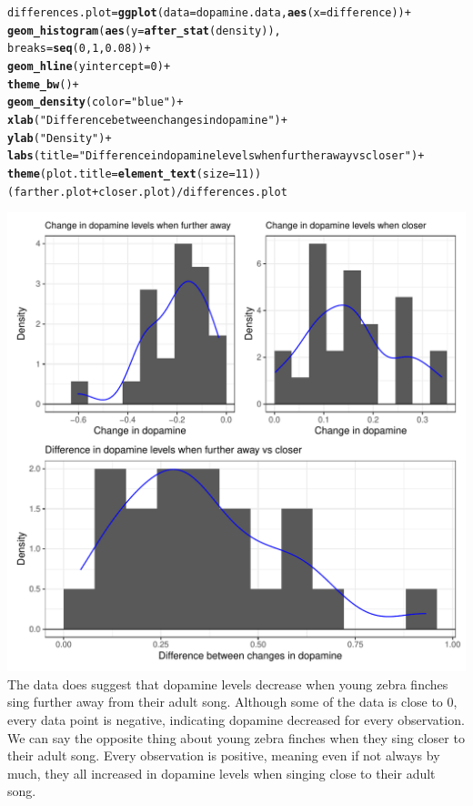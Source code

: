 \documentclass{article}\usepackage[]{graphicx}\usepackage[]{xcolor}
\makeatletter
\def\maxwidth{ %
  \ifdim\Gin@nat@width>\linewidth
    \linewidth
  \else
    \Gin@nat@width
  \fi
}
\newcommand{\hlnum}[1]{\textcolor[rgb]{0.686,0.059,0.569}{#1}}%
\newcommand{\hlsng}[1]{\textcolor[rgb]{0.192,0.494,0.8}{#1}}%
\newcommand{\hlopt}[1]{\textcolor[rgb]{0,0,0}{#1}}%
\newcommand{\hldef}[1]{\textcolor[rgb]{0.345,0.345,0.345}{#1}}%
\newcommand{\hlkwb}[1]{\textcolor[rgb]{0.69,0.353,0.396}{#1}}%
\newcommand{\hlkwc}[1]{\textcolor[rgb]{0.333,0.667,0.333}{#1}}%
\newcommand{\hlkwd}[1]{\textcolor[rgb]{0.737,0.353,0.396}{\textbf{#1}}}%
\newenvironment{kframe}{%
 \def\at@end@of@kframe{}%
 \ifinner\ifhmode%
  \def\at@end@of@kframe{\end{minipage}}%
  \begin{minipage}{\columnwidth}%
 \fi\fi%
 \def\FrameCommand##1{\hskip\@totalleftmargin \hskip-\fboxsep
 \colorbox{shadecolor}{##1}\hskip-\fboxsep
     \hskip-\linewidth \hskip-\@totalleftmargin \hskip\columnwidth}%
 \MakeFramed {\advance\hsize-\width
   \@totalleftmargin\z@ \linewidth\hsize
   \@setminipage}}%
 {\par\unskip\endMakeFramed%
 \at@end@of@kframe}
\newenvironment{knitrout}{}{} %
\makeatother
\begin{document}
\begin{enumerate}
\begin{enumerate}
\begin{knitrout}
\begin{kframe}
\begin{alltt}
\hldef{differences.plot} \hlkwb{=} \hlkwd{ggplot}\hldef{(}\hlkwc{data} \hldef{= dopamine.data,} \hlkwd{aes}\hldef{(}\hlkwc{x}\hldef{=difference))}\hlopt{+}
  \hlkwd{geom_histogram}\hldef{(}\hlkwd{aes}\hldef{(}\hlkwc{y}\hldef{=}\hlkwd{after_stat}\hldef{(density)),}
                 \hlkwc{breaks}\hldef{=}\hlkwd{seq}\hldef{(}\hlnum{0}\hldef{,}\hlnum{1}\hldef{,}\hlnum{0.08}\hldef{))} \hlopt{+}
  \hlkwd{geom_hline}\hldef{(}\hlkwc{yintercept}\hldef{=}\hlnum{0}\hldef{)}\hlopt{+}
  \hlkwd{theme_bw}\hldef{()}\hlopt{+}
  \hlkwd{geom_density}\hldef{(}\hlkwc{color} \hldef{=} \hlsng{"blue"}\hldef{)} \hlopt{+}
  \hlkwd{xlab}\hldef{(}\hlsng{"Difference between changes in dopamine"}\hldef{)}\hlopt{+}
  \hlkwd{ylab}\hldef{(}\hlsng{"Density"}\hldef{)}\hlopt{+}
  \hlkwd{labs}\hldef{(}\hlkwc{title} \hldef{=} \hlsng{"Difference in dopamine levels when further away vs closer"}\hldef{)} \hlopt{+}
  \hlkwd{theme}\hldef{(}\hlkwc{plot.title} \hldef{=} \hlkwd{element_text}\hldef{(}\hlkwc{size} \hldef{=} \hlnum{11}\hldef{))}
\hldef{(farther.plot} \hlopt{+} \hldef{closer.plot)} \hlopt{/} \hldef{differences.plot}
\end{alltt}
\end{kframe}
\includegraphics[width=\maxwidth]{figure/unnamed-chunk-4-1} 
\end{knitrout}
The data does suggest that dopamine levels decrease when young zebra finches sing further away from their adult song. Although some of the data is close to 0, every data point is negative, indicating dopamine decreased for every observation. We can say the opposite thing about young zebra finches when they sing closer to their adult song. Every observation is positive, meaning even if not always by much, they all increased in dopamine levels when singing close to their adult song.


\end{enumerate}
\end{enumerate}
\end{document}
